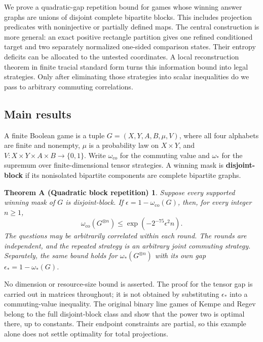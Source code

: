 \documentclass[11pt,reqno]{amsart}
\newtheorem*{theoremA}{Theorem A (Quadratic block repetition)}
\numberwithin{equation}{section}
\begin{document}
We prove a quadratic-gap repetition bound for games whose winning answer graphs are unions of disjoint complete bipartite blocks. This includes projection predicates with noninjective or partially defined maps. The central construction is more general: an exact positive rectangle partition gives one refined conditioned target and two separately normalized one-sided comparison states. Their entropy deficits can be allocated to the untested coordinates. A local reconstruction theorem in finite tracial standard form turns this information bound into legal strategies. Only after eliminating those strategies into scalar inequalities do we pass to arbitrary commuting correlations.

\subsection{Main results}\label{main-results}

A finite Boolean game is a tuple \(G=(X,Y,A,B,\mu,V)\), where all four alphabets are finite and nonempty, \(\mu\) is a probability law on \(X\times Y\), and \(V:X\times Y\times A\times B\to\{0,1\}\). Write \(\omega_{\mathrm{co}}\) for the commuting value and \(\omega_*\) for the supremum over finite-dimensional tensor strategies. A winning mask is \textbf{disjoint-block} if its nonisolated bipartite components are complete bipartite graphs.

\begin{theoremA}
Suppose every supported winning mask of \(G\) is disjoint-block. If
\(\epsilon=1-\omega_{\mathrm{co}}(G)\), then, for every integer \(n\ge1\),
\[
 \omega_{\mathrm{co}}(G^{\otimes n})
       \le \exp(-2^{-75}\epsilon^2n). \tag{A}
\]
The questions may be arbitrarily correlated within each round. The rounds are independent, and the repeated strategy is an arbitrary joint commuting strategy. Separately, the same bound holds for \(\omega_*(G^{\otimes n})\) with its own gap \(\epsilon_*=1-\omega_*(G)\).
\end{theoremA}

No dimension or resource-size bound is asserted. The proof for the tensor gap is carried out in matrices throughout; it is not obtained by substituting \(\epsilon_*\) into a commuting-value inequality. The original binary line games of Kempe and Regev \cite[Definition 3.1 and Theorems 3.2, 4.4]{KR} belong to the full disjoint-block class and show that the power two is optimal there, up to constants. Their endpoint constraints are partial, so this example alone does not settle optimality for total projections.
\end{document}
